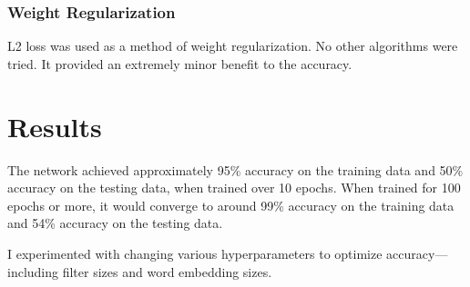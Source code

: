 \documentclass{article}
\begin{document}
\subsubsection{Weight Regularization}
L2 loss was used as a method of weight regularization. No other algorithms were tried. It provided an extremely minor benefit to the accuracy.

\section{Results}
The network achieved approximately 95\% accuracy on the training data and 50\% accuracy on the testing data, when trained over 10 epochs. When trained
for 100 epochs or more, it would converge to around 99\% accuracy on the training data and 54\% accuracy on the testing data.

I experimented with changing various hyperparameters to optimize accuracy—including filter sizes and word embedding sizes.
\end{document}
